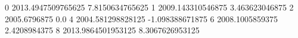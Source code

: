 0 2013.4947509765625 7.8150634765625
1 2009.143310546875 3.463623046875
2 2005.6796875 0.0
4 2004.581298828125 -1.098388671875
6 2008.1005859375 2.4208984375
8 2013.9864501953125 8.3067626953125
